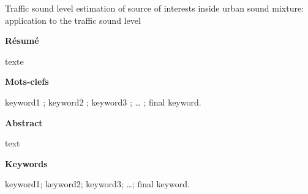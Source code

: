 \begin{cover}
	\cleardoublepage



  \noindent\textcolor{gray}{\LARGE \firstName{} \textsc{\surname}}
  
  \vspace{6pt}

  \begin{center}
    \begin{minipage}[c]{.75\linewidth}
      \large\color{gray}\bfseries
      \thesisTitle
      
      \vspace{18pt}

      \noindent Traffic sound level estimation of source of interests inside urban sound mixture: application to the traffic sound level

    \end{minipage}
  \end{center}
  \vspace{20pt}

  \begin{multicols}{2}
    \noindent\textbf{\large Résumé}
    \medskip
    
	texte
	
    \small\noindent 
    \bigskip

    \noindent
    \textbf{Mots-clefs}
    \smallskip

    \noindent 
    keyword1 ; keyword2 ; keyword3 ; \dots{} ; final keyword.

    \columnbreak

    \noindent
    \textbf{\large Abstract}
    \medskip
	
	text    
    
    \noindent 
    \bigskip

    \noindent
    \textbf{Keywords}
    \smallskip

    \noindent %
    keyword1; keyword2; keyword3; \dots{}; final keyword.
    
  \end{multicols}
\end{cover}

